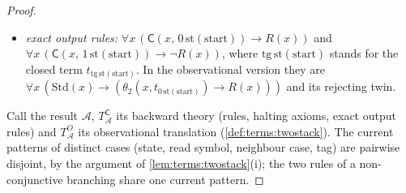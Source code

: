 \begin{proof}
\begin{itemize}[leftmargin=*]
\item \emph{exact output rules:} $\forall x\,(\mathsf C(x,\,0\,\mathrm{st}(\mathrm{start}))\to R(x))$ and $\forall x\,(\mathsf C(x,\,1\,\mathrm{st}(\mathrm{start}))\to\neg R(x))$, where $\mathrm{tg}\,\mathrm{st}(\mathrm{start})$ stands for the closed term $t_{\mathrm{tg}\,\mathrm{st}(\mathrm{start})}$. In the observational version they are $\forall x\,(\mathrm{Std}(x)\to(\theta_2(x,t_{0\,\mathrm{st}(\mathrm{start})})\to R(x)))$ and its rejecting twin.
\end{itemize}
Call the result $\mathcal A$, $T^{\mathsf C}_{\mathcal A}$ its backward theory (rules, halting axioms, exact output rules) and $T^O_{\mathcal A}$ its observational translation (\cref{def:terms:twostack}). The current patterns of distinct cases (state, read symbol, neighbour case, tag) are pairwise disjoint, by the argument of \cref{lem:terms:twostack}(i); the two rules of a non-conjunctive branching share one current pattern.


\end{proof}
